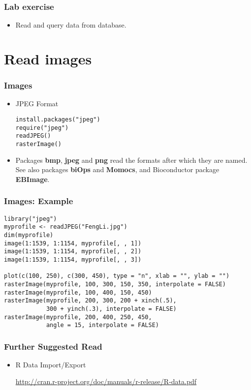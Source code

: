 \documentclass[10pt]{beamer}
\begin{document}
\begin{frame}
  \frametitle{Lab exercise}

    \begin{itemize}
    \item Read and query data from database.
    \end{itemize}
  \end{frame}

\section{Read images}

\begin{frame}[fragile]
  \frametitle{Images}

  \begin{itemize}
  \item JPEG Format
\begin{verbatim}
install.packages("jpeg")
require("jpeg")
readJPEG()
rasterImage()
\end{verbatim}

  \item Packages \textbf{bmp}, \textbf{jpeg} and \textbf{png} read the
    formats after which they are named. See also packages
    \textbf{biOps} and \textbf{Momocs}, and Bioconductor package
    \textbf{EBImage}.

  \end{itemize}

\end{frame}


\begin{frame}[fragile]
  \frametitle{Images: Example}

\begin{verbatim}
library("jpeg")
myprofile <- readJPEG("FengLi.jpg")
dim(myprofile)
image(1:1539, 1:1154, myprofile[, , 1])
image(1:1539, 1:1154, myprofile[, , 2])
image(1:1539, 1:1154, myprofile[, , 3])

plot(c(100, 250), c(300, 450), type = "n", xlab = "", ylab = "")
rasterImage(myprofile, 100, 300, 150, 350, interpolate = FALSE)
rasterImage(myprofile, 100, 400, 150, 450)
rasterImage(myprofile, 200, 300, 200 + xinch(.5),
            300 + yinch(.3), interpolate = FALSE)
rasterImage(myprofile, 200, 400, 250, 450,
            angle = 15, interpolate = FALSE)
\end{verbatim}

\end{frame}


\begin{frame}
  \frametitle{Further Suggested Read}
  \begin{itemize}
  \item R Data Import/Export

    \url{http://cran.r-project.org/doc/manuals/r-release/R-data.pdf}

  \end{itemize}
\end{frame}
\end{document}
